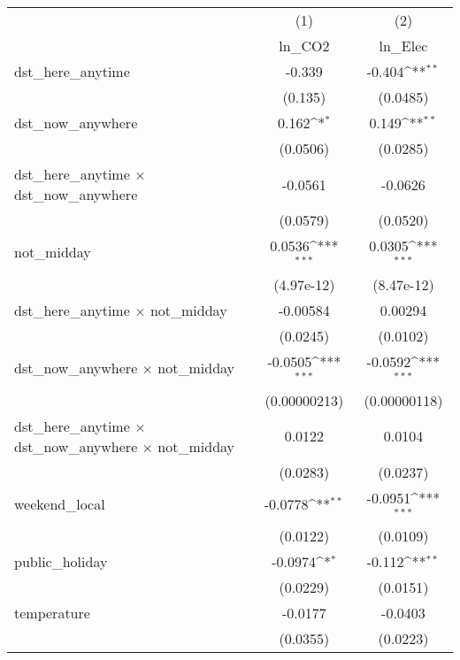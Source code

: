 {
\def\sym#1{\ifmmode^{#1}\else\(^{#1}\)\fi}
\begin{tabular}{l*{2}{c}}
\hline\hline
                    &\multicolumn{1}{c}{(1)}&\multicolumn{1}{c}{(2)}\\
                    &\multicolumn{1}{c}{ln\_CO2}&\multicolumn{1}{c}{ln\_Elec}\\
\hline
dst\_here\_anytime    &      -0.339         &      -0.404\sym{**} \\
                    &     (0.135)         &    (0.0485)         \\
[1em]
dst\_now\_anywhere    &       0.162\sym{*}  &       0.149\sym{**} \\
                    &    (0.0506)         &    (0.0285)         \\
[1em]
dst\_here\_anytime $\times$ dst\_now\_anywhere&     -0.0561         &     -0.0626         \\
                    &    (0.0579)         &    (0.0520)         \\
[1em]
not\_midday          &      0.0536\sym{***}&      0.0305\sym{***}\\
                    &  (4.97e-12)         &  (8.47e-12)         \\
[1em]
dst\_here\_anytime $\times$ not\_midday&    -0.00584         &     0.00294         \\
                    &    (0.0245)         &    (0.0102)         \\
[1em]
dst\_now\_anywhere $\times$ not\_midday&     -0.0505\sym{***}&     -0.0592\sym{***}\\
                    &(0.00000213)         &(0.00000118)         \\
[1em]
dst\_here\_anytime $\times$ dst\_now\_anywhere $\times$ not\_midday&      0.0122         &      0.0104         \\
                    &    (0.0283)         &    (0.0237)         \\
[1em]
weekend\_local       &     -0.0778\sym{**} &     -0.0951\sym{***}\\
                    &    (0.0122)         &    (0.0109)         \\
[1em]
public\_holiday      &     -0.0974\sym{*}  &      -0.112\sym{**} \\
                    &    (0.0229)         &    (0.0151)         \\
[1em]
temperature         &     -0.0177         &     -0.0403         \\
                    &    (0.0355)         &    (0.0223)         \\

\end{tabular}}
